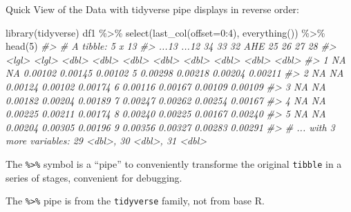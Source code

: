 \documentclass[
  11pt,
  ignorenonframetext,
  svgnames, handout, t]{beamer}
\newenvironment{Shaded}{\begin{snugshade}}{\end{snugshade}}
\newcommand{\AttributeTok}[1]{\textcolor[rgb]{0.77,0.63,0.00}{#1}}
\newcommand{\CommentTok}[1]{\textcolor[rgb]{0.56,0.35,0.01}{\textit{#1}}}
\newcommand{\DecValTok}[1]{\textcolor[rgb]{0.00,0.00,0.81}{#1}}
\newcommand{\FunctionTok}[1]{\textcolor[rgb]{0.00,0.00,0.00}{#1}}
\newcommand{\NormalTok}[1]{#1}
\newcommand{\SpecialCharTok}[1]{\textcolor[rgb]{0.00,0.00,0.00}{#1}}
\begin{document}
\begin{frame}[fragile]{Quick View of the Data}
\protect\hypertarget{quick-view-of-the-data-6}{}
with tidyverse pipe \textbar{} displays in reverse order:

\footnotesize

\begin{Shaded}
\begin{Highlighting}[]
\FunctionTok{library}\NormalTok{(tidyverse)}
\NormalTok{df1 }\SpecialCharTok{\%\textgreater{}\%} \FunctionTok{select}\NormalTok{(}\FunctionTok{last\_col}\NormalTok{(}\AttributeTok{offset=}\DecValTok{0}\SpecialCharTok{:}\DecValTok{4}\NormalTok{), }\FunctionTok{everything}\NormalTok{()) }\SpecialCharTok{\%\textgreater{}\%} \FunctionTok{head}\NormalTok{(}\DecValTok{5}\NormalTok{)}
\CommentTok{\#\textgreater{} \# A tibble: 5 x 13}
\CommentTok{\#\textgreater{}   ...13 ...12    \textasciigrave{}34\textasciigrave{}    \textasciigrave{}33\textasciigrave{}    \textasciigrave{}32\textasciigrave{}   AHE    \textasciigrave{}25\textasciigrave{}    \textasciigrave{}26\textasciigrave{}    \textasciigrave{}27\textasciigrave{}    \textasciigrave{}28\textasciigrave{}}
\CommentTok{\#\textgreater{}   \textless{}lgl\textgreater{} \textless{}lgl\textgreater{}   \textless{}dbl\textgreater{}   \textless{}dbl\textgreater{}   \textless{}dbl\textgreater{} \textless{}dbl\textgreater{}   \textless{}dbl\textgreater{}   \textless{}dbl\textgreater{}   \textless{}dbl\textgreater{}   \textless{}dbl\textgreater{}}
\CommentTok{\#\textgreater{} 1 NA    NA    0.00102 0.00145 0.00102     5 0.00298 0.00218 0.00204 0.00211}
\CommentTok{\#\textgreater{} 2 NA    NA    0.00124 0.00102 0.00174     6 0.00116 0.00167 0.00109 0.00109}
\CommentTok{\#\textgreater{} 3 NA    NA    0.00182 0.00204 0.00189     7 0.00247 0.00262 0.00254 0.00167}
\CommentTok{\#\textgreater{} 4 NA    NA    0.00225 0.00211 0.00174     8 0.00240 0.00225 0.00167 0.00240}
\CommentTok{\#\textgreater{} 5 NA    NA    0.00204 0.00305 0.00196     9 0.00356 0.00327 0.00283 0.00291}
\CommentTok{\#\textgreater{} \# ... with 3 more variables: \textasciigrave{}29\textasciigrave{} \textless{}dbl\textgreater{}, \textasciigrave{}30\textasciigrave{} \textless{}dbl\textgreater{}, \textasciigrave{}31\textasciigrave{} \textless{}dbl\textgreater{}}
\end{Highlighting}
\end{Shaded}

\normalsize

The \texttt{\%\textgreater{}\%} symbol is a ``pipe'' to conveniently
transforme the original \texttt{tibble} in a series of stages,
convenient for debugging.

The \texttt{\%\textgreater{}\%} pipe is from the \texttt{tidyverse}
family, not from base R.
\end{frame}
\end{document}
